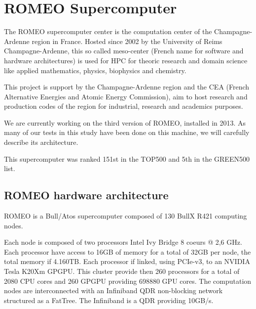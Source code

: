 
\section{ROMEO Supercomputer}

The ROMEO supercomputer center is the computation center of the Champagne-Ardenne region in France. 
Hosted since 2002 by the University of Reims Champagne-Ardenne, this so called meso-center (French name for software and hardware architectures) is used for HPC for theoric research and domain science like applied mathematics, physics, biophysics and chemistry. 

This project is support by the Champagne-Ardenne region and the CEA (French Alternative Energies and Atomic Energy Commission), aim to host research and production codes of the region for industrial, research and academics purposes. 

We are currently working on the third version of ROMEO, installed in 2013. 
As many of our tests in this study have been done on this machine, we will carefully describe its architecture. 

This supercomputer was ranked 151st in the TOP500 and 5th in the GREEN500 list. 

\subsection{ROMEO hardware architecture}
ROMEO is a Bull/Atos supercomputer composed of 130 BullX R421 computing nodes. 

Each node is composed of two processors Intel Ivy Bridge 8 coeurs @ 2,6 GHz. 
Each processor have access to 16GB of memory for a total of 32GB per node, the total memory if 4.160TB. 
Each processor if linked, using PCIe-v3, to an NVIDIA Tesla K20Xm GPGPU. 
This cluster provide then 260 processors for a total of 2080 CPU cores and 260 GPGPU providing 698880 GPU cores. 
The computation nodes are interconnected with an Infiniband QDR non-blocking network structured as a FatTree. 
The Infiniband is a QDR providing 10GB/s. 

